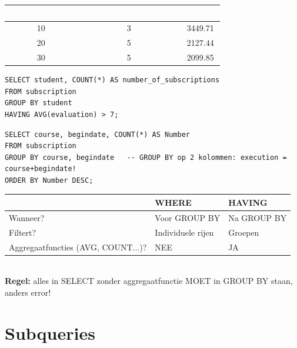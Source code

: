 \documentclass[10pt,a4paper]{article}
\newcommand{\TBLH}[1]{\textbf{\textcolor{white}{#1}}}
\begin{document}
\begin{tcolorbox}[resbox,title=Resultaat]
{\scriptsize\begin{tabular}{|c|c|c|}
\hline
\rowcolor{tblhead}\TBLH{department\_nr} & \TBLH{number\_of\_employees} & \TBLH{average} \\ \hline
10 & 3 & 3449.71 \\ \hline
\rowcolor{rowalt}
20 & 5 & 2127.44 \\ \hline
30 & 5 & 2099.85 \\ \hline
\end{tabular}}
\end{tcolorbox}

\begin{tcolorbox}[sqlbox,title=Voorbeeld 2: HAVING --- studenten met gem evaluatie $>$ 7]
\begin{lstlisting}
SELECT student, COUNT(*) AS number_of_subscriptions
FROM subscription
GROUP BY student
HAVING AVG(evaluation) > 7;
\end{lstlisting}
\end{tcolorbox}

\begin{tcolorbox}[sqlbox,title=Voorbeeld 3: subscriptions per execution gesorteerd]
\begin{lstlisting}
SELECT course, begindate, COUNT(*) AS Number
FROM subscription
GROUP BY course, begindate   -- GROUP BY op 2 kolommen: execution = course+begindate!
ORDER BY Number DESC;
\end{lstlisting}
\end{tcolorbox}

\begin{tcolorbox}[notebox,title=WHERE vs HAVING]
{\footnotesize\begin{tabular}{lll}
 & \textbf{WHERE} & \textbf{HAVING} \\ \midrule
Wanneer? & Voor GROUP BY & Na GROUP BY \\
Filtert? & Individuele rijen & Groepen \\
Aggregaatfuncties (AVG, COUNT...)? & NEE & JA \\
\end{tabular}}\\[3pt]
\textbf{Regel:} alles in SELECT zonder aggregaatfunctie MOET in GROUP BY staan, anders error!
\end{tcolorbox}

\section{Subqueries}
\end{document}
